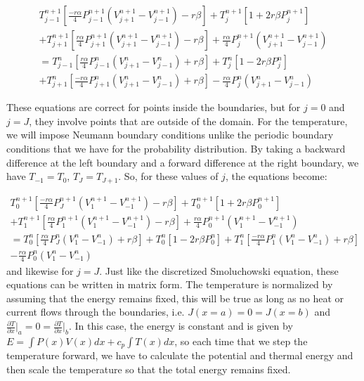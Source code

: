 \begin{multline}
T_{j-1}^{n+1} \left [\frac{-r \alpha}{4}P_{j-1}^{n+1}(V_{j+1}^{n+1} - V_{j-1}^{n+1}) - r \beta \right]
+ T_j^{n+1} \left[1 + 2 r \beta P_j^{n+1} \right] \\
+T_{j+1}^{n+1} \left [\frac{r \alpha}{4} P_{j+1}^{n+1}(V_{j+1}^{n+1} - V_{j-1}^{n+1}) - r \beta \right]
+\frac{r \alpha}{4} P_{j}^{n+1} \left(V_{j+1}^{n+1} - V_{j-1}^{n+1} \right) \\
 = T_{j-1}^{n} \left [\frac{r \alpha}{4}P_{j-1}^{n}(V_{j+1}^{n} - V_{j-1}^{n}) + r \beta \right ] + T_j^{n} \left[1 - 2 r \beta P_j^{n} \right] \\
+T_{j+1}^{n} \left [\frac{-r \alpha}{4} P_{j+1}^{n}(V_{j+1}^{n} - V_{j-1}^{n}) + r \beta \right]
-\frac{r \alpha}{4} P_{j}^{n} \left(V_{j+1}^{n} - V_{j-1}^{n} \right)
\end{multline}

These equations are correct for points inside the boundaries, but for $j = 0$ and $j = J$, they involve points that are outside of the domain. For the temperature, we will impose Neumann boundary conditions unlike the periodic boundary conditions that we have for the probability distribution. By taking a backward difference at the left boundary and a forward difference at the right boundary, we have $T_{-1} = T_0$, $T_J = T_{J+1}$. So, for these values of $j$, the equations become:

\begin{multline}
T_0^{n+1} \left [\frac{-r \alpha}{4}P_J^{n+1}(V_1^{n+1} - V_{-1}^{n+1}) - r \beta \right] + T_0^{n+1} \left[1 + 2 r \beta P_0^{n+1} \right] \\
+T_{1}^{n+1} \left [\frac{r \alpha}{4} P_{1}^{n+1}(V_{1}^{n+1} - V_{-1}^{n+1}) - r \beta \right]
+\frac{r \alpha}{4} P_{0}^{n+1} \left(V_{1}^{n+1} - V_{-1}^{n+1} \right) \\
 = T_{0}^{n} \left [\frac{r \alpha}{4}P_{J}^{n}(V_{1}^{n} - V_{-1}^{n}) + r \beta \right ] + T_0^{n} \left[1 - 2 r \beta P_0^{n} \right]
+T_{1}^{n} \left [\frac{-r \alpha}{4} P_{1}^{n}(V_{1}^{n} - V_{-1}^{n}) + r \beta \right] \\
-\frac{r \alpha}{4} P_{0}^{n} \left(V_{1}^{n} - V_{-1}^{n} \right)
\end{multline}
and likewise for $j = J$. Just like the discretized Smoluchowski equation, these equations can be written in matrix form. The temperature is normalized by assuming that the energy remains fixed, this will be true as long as no heat or current flows through the boundaries, i.e. $J(x=a) = 0 = J(x = b)$ and $\frac{\partial T}{\partial x} \rvert_a = 0 = \frac{\partial T}{\partial x} \rvert_b$. In this case, the energy is constant and is given by $E = \int P(x) V(x) dx + c_p \int T(x) dx$, so each time that we step the temperature forward, we have to calculate the potential and thermal energy and then scale the temperature so that the total energy remains fixed.

